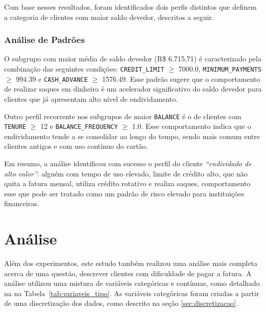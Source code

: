 \documentclass[12pt]{article}
\begin{document}
Com base nesses resultados, foram identificados dois perfis distintos que definem a categoria de clientes com maior saldo devedor, descritos a seguir.

\subsubsection{Análise de Padrões}

\hspace{1.2cm}O subgrupo com maior média de saldo devedor (R\$ 6.715,71) é caracterizado pela combinação das seguintes condições: \texttt{CREDIT\_LIMIT} $\geq$ 7000.0, \texttt{MINIMUM\_PAYMENTS} $\geq$ 994.39 e \texttt{CASH\_ADVANCE} $\geq$ 1576.49. Esse padrão sugere que o comportamento de realizar saques em dinheiro é um acelerador significativo do saldo devedor para clientes que já apresentam alto nível de endividamento.

Outro perfil recorrente nos subgrupos de maior \texttt{BALANCE} é o de clientes com \texttt{TENURE} $\geq$ 12 e \texttt{BALANCE\_FREQUENCY} $\geq$ 1.0. Esse comportamento indica que o endividamento tende a se consolidar ao longo do tempo, sendo mais comum entre clientes antigos e com uso contínuo do cartão.

Em resumo, a análise identificou com sucesso o perfil do cliente \textit{``endividado de alto valor''}: alguém com tempo de uso elevado, limite de crédito alto, que não quita a fatura mensal, utiliza crédito rotativo e realiza saques, comportamento esse que pode ser tratado como um padrão de risco elevado para instituições financeiras.

\section{Análise} \label{sec:analise}

\hspace{1.2cm}Além dos experimentos, este estudo também realizou uma análise mais completa acerca de uma questão, descrever clientes com dificuldade de pagar a fatura. A análise utilizou uma mistura de variáveis categóricas e contínuas, como detalhado na na Tabela~\ref{tab:variaveis_tipo}. As variáveis categóricas foram criadas a partir de uma discretização dos dados, como descrito na seção \ref{sec:discretizacao}. 


\end{document}
